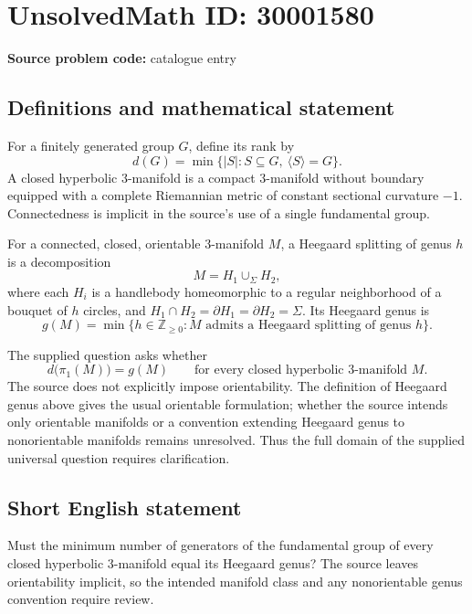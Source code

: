 \documentclass[11pt]{article}
\newcommand{\Z}{\mathbb{Z}}
\begin{document}
\section*{UnsolvedMath ID: 30001580}
\textbf{Source problem code:} catalogue entry
\subsection{Definitions and mathematical statement}
For a finitely generated group \(G\), define its rank by
\[
d(G)=\min\{\lvert S\rvert:S\subseteq G,\ \langle S\rangle=G\}.
\]
A closed hyperbolic \(3\)-manifold is a compact \(3\)-manifold without boundary equipped with a complete Riemannian metric of constant sectional curvature \(-1\). Connectedness is implicit in the source's use of a single fundamental group.

For a connected, closed, orientable \(3\)-manifold \(M\), a Heegaard splitting of genus \(h\) is a decomposition
\[
M=H_1\cup_{\Sigma}H_2,
\]
where each \(H_i\) is a handlebody homeomorphic to a regular neighborhood of a bouquet of \(h\) circles, and \(H_1\cap H_2=\partial H_1=\partial H_2=\Sigma\). Its Heegaard genus is
\[
g(M)=\min\{h\in\Z_{\geq0}:M\text{ admits a Heegaard splitting of genus }h\}.
\]

The supplied question asks whether
\[
d\bigl(\pi_1(M)\bigr)=g(M)
\qquad\text{for every closed hyperbolic }3\text{-manifold }M.
\]
The source does not explicitly impose orientability. The definition of Heegaard genus above gives the usual orientable formulation; whether the source intends only orientable manifolds or a convention extending Heegaard genus to nonorientable manifolds remains unresolved. Thus the full domain of the supplied universal question requires clarification.
\subsection{Short English statement}
Must the minimum number of generators of the fundamental group of every closed hyperbolic \(3\)-manifold equal its Heegaard genus? The source leaves orientability implicit, so the intended manifold class and any nonorientable genus convention require review.
\end{document}
